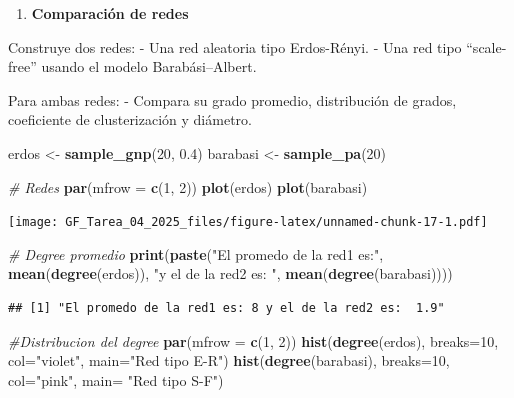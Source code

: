 \documentclass[
]{article}
\newenvironment{Shaded}{\begin{snugshade}}{\end{snugshade}}
\newcommand{\AttributeTok}[1]{\textcolor[rgb]{0.13,0.29,0.53}{#1}}
\newcommand{\CommentTok}[1]{\textcolor[rgb]{0.56,0.35,0.01}{\textit{#1}}}
\newcommand{\DecValTok}[1]{\textcolor[rgb]{0.00,0.00,0.81}{#1}}
\newcommand{\FloatTok}[1]{\textcolor[rgb]{0.00,0.00,0.81}{#1}}
\newcommand{\FunctionTok}[1]{\textcolor[rgb]{0.13,0.29,0.53}{\textbf{#1}}}
\newcommand{\NormalTok}[1]{#1}
\newcommand{\OtherTok}[1]{\textcolor[rgb]{0.56,0.35,0.01}{#1}}
\newcommand{\StringTok}[1]{\textcolor[rgb]{0.31,0.60,0.02}{#1}}
\providecommand{\tightlist}{%
  \setlength{\itemsep}{0pt}\setlength{\parskip}{0pt}}
\begin{document}
\begin{enumerate}
\def\labelenumi{\arabic{enumi}.}
\setcounter{enumi}{5}
\tightlist
\item
  \textbf{Comparación de redes}
\end{enumerate}

Construye dos redes: - Una red aleatoria tipo Erdos-Rényi. - Una red
tipo ``scale-free'' usando el modelo Barabási--Albert.

Para ambas redes: - Compara su grado promedio, distribución de grados,
coeficiente de clusterización y diámetro.

\begin{Shaded}
\begin{Highlighting}[]
\NormalTok{erdos }\OtherTok{\textless{}{-}} \FunctionTok{sample\_gnp}\NormalTok{(}\DecValTok{20}\NormalTok{, }\FloatTok{0.4}\NormalTok{)}
\NormalTok{barabasi }\OtherTok{\textless{}{-}} \FunctionTok{sample\_pa}\NormalTok{(}\DecValTok{20}\NormalTok{)}

\CommentTok{\# Redes}
\FunctionTok{par}\NormalTok{(}\AttributeTok{mfrow =} \FunctionTok{c}\NormalTok{(}\DecValTok{1}\NormalTok{, }\DecValTok{2}\NormalTok{))}
\FunctionTok{plot}\NormalTok{(erdos)}
\FunctionTok{plot}\NormalTok{(barabasi)}
\end{Highlighting}
\end{Shaded}

\texttt{[image: GF\_Tarea\_04\_2025\_files/figure-latex/unnamed-chunk-17-1.pdf]}

\begin{Shaded}
\begin{Highlighting}[]
\CommentTok{\# Degree promedio}
\FunctionTok{print}\NormalTok{(}\FunctionTok{paste}\NormalTok{(}\StringTok{"El promedo de la red1 es:"}\NormalTok{, }\FunctionTok{mean}\NormalTok{(}\FunctionTok{degree}\NormalTok{(erdos)), }\StringTok{"y el de la red2 es: "}\NormalTok{, }\FunctionTok{mean}\NormalTok{(}\FunctionTok{degree}\NormalTok{(barabasi))))}
\end{Highlighting}
\end{Shaded}

\begin{verbatim}
## [1] "El promedo de la red1 es: 8 y el de la red2 es:  1.9"
\end{verbatim}

\begin{Shaded}
\begin{Highlighting}[]
\CommentTok{\#Distribucion del degree}
\FunctionTok{par}\NormalTok{(}\AttributeTok{mfrow =} \FunctionTok{c}\NormalTok{(}\DecValTok{1}\NormalTok{, }\DecValTok{2}\NormalTok{))}
\FunctionTok{hist}\NormalTok{(}\FunctionTok{degree}\NormalTok{(erdos), }\AttributeTok{breaks=}\DecValTok{10}\NormalTok{, }\AttributeTok{col=}\StringTok{"violet"}\NormalTok{, }\AttributeTok{main=}\StringTok{"Red tipo E{-}R"}\NormalTok{)}
\FunctionTok{hist}\NormalTok{(}\FunctionTok{degree}\NormalTok{(barabasi), }\AttributeTok{breaks=}\DecValTok{10}\NormalTok{, }\AttributeTok{col=}\StringTok{"pink"}\NormalTok{, }\AttributeTok{main=} \StringTok{"Red tipo S{-}F"}\NormalTok{)}
\end{Highlighting}
\end{Shaded}
\end{document}
